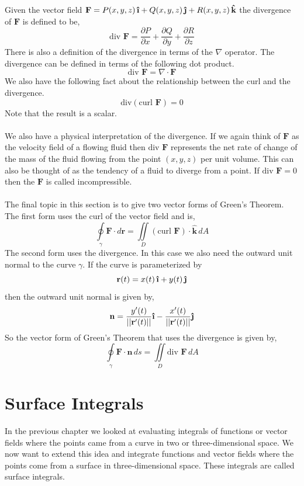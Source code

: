 \documentclass[10pt,reqno]{book}
\theoremstyle{definition}
\renewcommand{\vec}[1]{\mathbf{#1}}
\newcommand{\uvec}[1]{\boldsymbol{\hat{\textbf{#1}}}}
\begin{document}
	Given the vector field $ \vec{F} = P(x,y,z)\, \uvec{\i} + Q(x,y,z)\,\uvec{\j} + R(x,y,z)\,\uvec{k} $ the divergence of $ \vec{F} $ is defined to be, 
	\[ \text{div } \vec{F} = \frac{\partial P}{\partial x} + \frac{\partial Q}{\partial y} + \frac{\partial R}{\partial z}  \]
	There is also a definition of the divergence in terms of the $ \nabla $ operator. The divergence can be defined in terms of the following dot product.
	\[ \text{div } \vec{F} = \nabla \cdot \vec{F} \]
	We also have the following fact about the relationship between the curl and the divergence.
	\[ \text{div} (\text{curl } \vec{F}) = 0 \]
	Note that the result is a scalar.\\ \\
	We also have a physical interpretation of the divergence. If we again think of $ \vec{F} $ as the velocity field of a flowing fluid then $ \text{div } \vec{F} $ represents the net rate of change of the mass of the fluid flowing from the point $ (x,y,z) $ per unit volume. This can also be thought of as the tendency of a fluid to diverge from a point. If $ \text{div } \vec{F} = 0 $ then the $ \vec{F} $ is called incompressible.\\ \\
	The final topic in this section is to give two vector forms of Green's Theorem. The first form uses the curl of the vector field and is,
	\[ \oint\limits_{\gamma} \vec{F} \cdot d\vec{r} = \iint\limits_D (\text{curl } \vec{F}) \cdot \uvec{k} \,  dA \]
	The second form uses the divergence. In this case we also need the outward unit normal to the curve $ \gamma $. If the curve is parameterized by 
	\[ \vec{r}(t) = x(t)\,\uvec{\i} + y(t)\,\uvec{\j} \]
	then the outward unit normal is given by,
	\[ \vec{n} = \frac{y'(t)}{||\vec{r}'(t)||} \uvec{\i} - \frac{x'(t)}{||\vec{r}'(t)||} \uvec{\j} \]
	So the vector form of Green's Theorem that uses the divergence is given by,
	\[ \oint\limits_{\gamma} \vec{F} \cdot \vec{n}\,ds = \iint\limits_D \text{div } \vec{F}\,dA \]
	
	\chapter{Surface Integrals}
	
	In the previous chapter we looked at evaluating integrals of functions or vector fields where the points came from a curve in two or three-dimensional space. We now want to extend this idea and integrate functions and vector fields where the points come from a surface in three-dimensional space. These integrals are called surface integrals.
	
\end{document}
